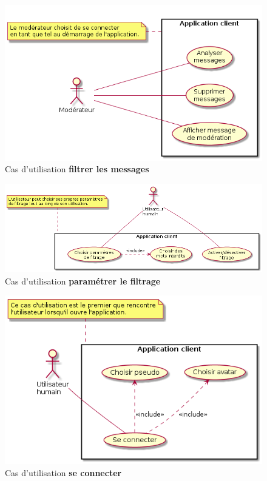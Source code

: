 \documentclass[11pt,dvipsnames,svgnames]{report}
\begin{document}
\begin{center}
\begin{figure}[H]
\includegraphics[scale=0.7]{images/uc-filtrerMessages.png}
\vspace{5\baselineskip}
\caption{Cas d'utilisation \textbf{filtrer les messages}}
\end{figure}

\begin{figure}
\includegraphics[scale=0.6]{images/uc-parametrerFiltrage.png}
\caption{Cas d'utilisation \textbf{paramétrer le filtrage}}
\end{figure}

\begin{figure}
\includegraphics[scale=0.7]{images/uc-seConnecter.png}
\caption{Cas d'utilisation \textbf{se connecter}}
\end{figure}

\end{center}
\end{document}
